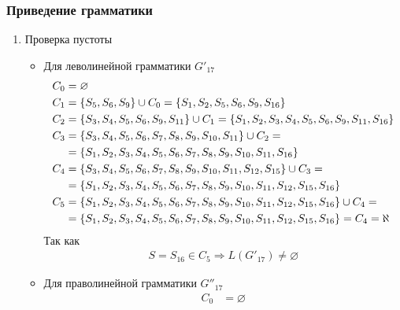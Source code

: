 \subsubsection{Приведение грамматики}
\begin{enumerate}
	\item Проверка пустоты
	      \begin{itemize}
		      \item Для леволинейной грамматики \(G'_{17}\)
		            \begin{align*}
			            C_0   & = \varnothing                                                                                                \\
			            C_{1} & = \left\{S_5, S_6, S_9\right\} \cup C_{0} = \left\{S_1, S_2, S_5, S_6, S_9, S_{16}\right\}                                     \\
			            C_{2} & = \left\{S_3, S_4, S_5, S_6, S_9, S_{11}\right\} \cup C_{1} = \left\{S_1, S_2, S_3, S_4, S_5, S_6, S_9, S_{11}, S_{16}\right\} \\
			            C_{3} & = \left\{S_3, S_4, S_5, S_6, S_7, S_8, S_9, S_{10}, S_{11}\right\} \cup C_{2} =
			            \\ &= \left\{S_1, S_2, S_3, S_4, S_5, S_6, S_7, S_8, S_9, S_{10}, S_{11}, S_{16}\right\}                                      \\
			            C_{4} & = \left\{S_3, S_4, S_5, S_6, S_7, S_8, S_9, S_{10}, S_{11}, S_{12}, S_{15}\right\} \cup C_{3}  =                      \\
			                  & = \left\{S_1, S_2, S_3, S_4, S_5, S_6, S_7, S_8, S_9, S_{10}, S_{11}, S_{12}, S_{15}, S_{16}\right\}                  \\
			            C_{5} & = \left\{S_1, S_2, S_3, S_4, S_5, S_6, S_7, S_8, S_9, S_{10}, S_{11}, S_{12}, S_{15}, S_{16}\right\} \cup C_{4} =     \\
			                  & = \left\{S_1, S_2, S_3, S_4, S_5, S_6, S_7, S_8, S_9, S_{10}, S_{11}, S_{12}, S_{15}, S_{16}\right\} = C_4 = \aleph   \\
		            \end{align*}
		            Так как
		            \begin{align}
			            S = S_{16} \in C_5 \Longrightarrow L(G'_{17}) \not= \varnothing
		            \end{align}
		      \item Для праволинейной грамматики \(G''_{17}\)
		            \begin{align*}
			            C_0   & = \varnothing                                                                                                                \\

\end{align*}
\end{itemize}
\end{enumerate}

